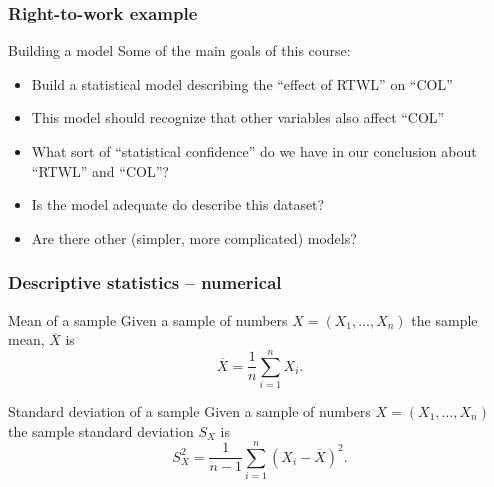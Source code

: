 \documentclass[handout]{beamer}
\begin{document}
   \begin{frame} \frametitle{Right-to-work example}

   \begin{block}
   {Building a model}
   Some of the main goals of this course:

   \begin{itemize}
   \item Build a statistical model describing the ``effect of RTWL'' on ``COL''

   \item This model should recognize that other variables also affect ``COL''

   \item What sort of ``statistical confidence'' do we have in our
   conclusion about ``RTWL'' and ``COL''?

   \item Is the model adequate do describe this dataset?

   \item Are there other (simpler, more complicated) models?
   \end{itemize}
   \end{block}
   \end{frame}


   \begin{frame} \frametitle{Descriptive statistics -- numerical}

   \begin{block}
   {Mean of a sample}
   Given a sample of numbers $X=(X_1, \dots, X_n)$ the sample mean,
   $\overline{X}$ is
   $$
   \overline{X} = \frac1n \sum_{i=1}^n X_i.$$
   \end{block}

   \begin{block}
   {Standard deviation of a sample}
   Given a sample of numbers $X=(X_1, \dots, X_n)$ the sample
   standard deviation $S_X$ is
   $$
   S^2_X = \frac{1}{n-1}  \sum_{i=1}^n (X_i-\overline{X})^2.$$
   \end{block}
   \end{frame}

\end{document}
